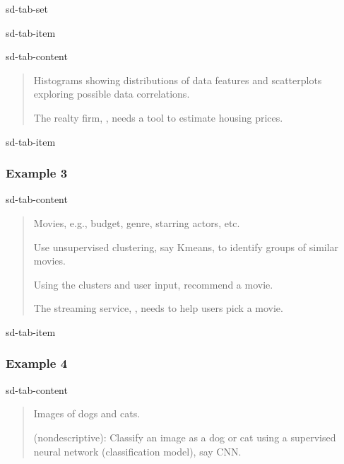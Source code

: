 \documentclass[letterpaper,10pt,english]{jupyterBook}
\begin{document}
\begin{sphinxuseclass}{sd-tab-set}
\begin{sphinxuseclass}{sd-tab-item}
\begin{sphinxuseclass}{sd-tab-content}
\begin{quote}
\sphinxAtStartPar
{} Histograms showing distributions of data features and scatterplots exploring possible data correlations.

\sphinxAtStartPar
{} The realty firm, , needs a tool to estimate housing prices.
\end{quote}

\end{sphinxuseclass}
\end{sphinxuseclass}
\begin{sphinxuseclass}{sd-tab-item}\subsubsection*{Example 3}

\begin{sphinxuseclass}{sd-tab-content}\begin{quote}

\sphinxAtStartPar
{} Movies, e.g., budget, genre, starring actors, etc.

\sphinxAtStartPar
{} Use unsupervised clustering, say K\sphinxhyphen{}means, to identify groups of similar movies.

\sphinxAtStartPar
{} Using the clusters and user input, recommend a movie.

\sphinxAtStartPar
{} The streaming service, , needs to help users pick a movie.
\end{quote}

\end{sphinxuseclass}
\end{sphinxuseclass}
\begin{sphinxuseclass}{sd-tab-item}\subsubsection*{Example 4}

\begin{sphinxuseclass}{sd-tab-content}\begin{quote}

\sphinxAtStartPar
{} Images of dogs and cats.

\sphinxAtStartPar
{} (non\sphinxhyphen{}descriptive): Classify an image as a dog or cat using a supervised neural network (classification model), say CNN.


\end{quote}
\end{sphinxuseclass}
\end{sphinxuseclass}
\end{sphinxuseclass}
\end{document}
